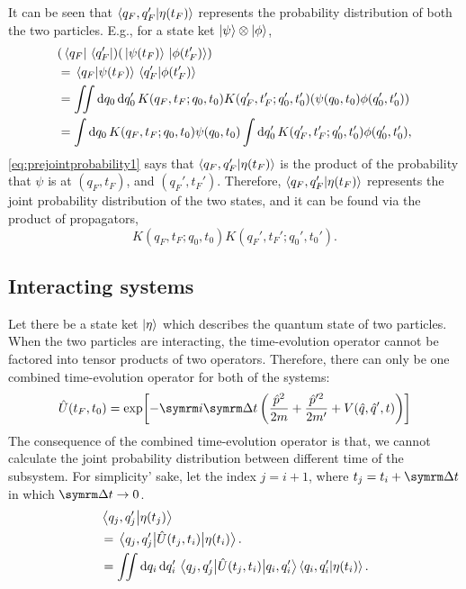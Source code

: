 It can be seen that $\braket{q_F, q_F'}{\eta(t_F)}$ represents the probability distribution of both the two particles. E.g., for a state ket $\ket{\psi}\otimes\ket{\phi}$,
\begin{align}
    & (\bra*{q_F}\bra*{q_F'})(\ket*{\psi(t_F)}\ket*{\phi(t_F')}) \\
    &= \braket*{q_F}{\psi(t_F)}\braket*{q_F'}{\phi(t_F')} \label{eq:prejointprobability1}\\
    &= \iint\dd{q_0}\dd{q_0'}K(q_F, t_F; q_0, t_0)K(q_F', t_F';q_0', t_0')(\psi(q_0, t_0)\phi(q_0', t_0')) \\
    &= \int\dd{q_0}K(q_F, t_F; q_0, t_0)\psi(q_0, t_0)\int\dd{q_0'}K(q_F', t_F';q_0', t_0')\phi(q_0', t_0'), \label{eq:prejointprobability2}
\end{align}
\cref{eq:prejointprobability1} says that $\braket{q_F, q_F'}{\eta(t_F)}$ is the product of the probability that $\psi$ is at $(q_F, t_F)$, and $(q_F', t_F')$. Therefore, $\braket{q_F, q_F'}{\eta(t_F)}$ represents the joint probability distribution of the two states, and it can be found via the product of propagators,
\begin{equation}
    K(q_F, t_F; q_0, t_0)K(q_F', t_F';q_0', t_0').
\end{equation}

\subsection{Interacting systems}

Let there be a state ket $\ket{\eta}$ which describes the quantum state of two particles. When the two particles are interacting, the time-evolution operator cannot be factored into tensor products of two operators. Therefore, there can only be one combined time-evolution operator for both of the systems:
\begin{equation}
    \hat{U}(t_F, t_0) = \exp[-\im\Dd{t}\left(\frac{\hat{p}^2}{2m} + \frac{\hat{p}'^2}{2m'} + V(\hat{q}, \hat{q}', t)\right)]
\end{equation}
The consequence of the combined time-evolution operator is that, we cannot calculate the joint probability distribution between different time of the subsystem. For simplicity’ sake, let the index $j = i + 1$, where $t_j = t_i + \Dd{t}$ in which $\Dd{t} \appr 0$.
\begin{align}
    &\braket{q_j, q_j'}{\eta(t_j)} \\
    &= \mel{q_j, q_j'}{\hat{U}(t_j, t_i)}{\eta(t_i)}. \\
    &= \iint \dd{q_i}\dd{q_i'} \mel{q_j, q_j'}{\hat{U}(t_j, t_i)}{q_i, q_i'}\braket{q_i, q_i'}{\eta(t_i)}.
\end{align}

